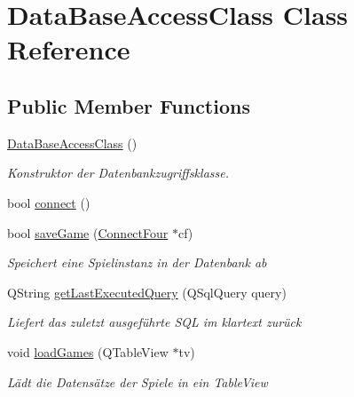 \hypertarget{class_data_base_access_class}{\section{Data\-Base\-Access\-Class Class Reference}
\label{class_data_base_access_class}
}
\subsection*{Public Member Functions}
\begin{DoxyCompactItemize}
\item 
\hyperlink{class_data_base_access_class_a44e5ea09d3bb57547bf4ed458549b00e}{Data\-Base\-Access\-Class} ()
\begin{DoxyCompactList}\small\item\em Konstruktor der Datenbankzugriffsklasse. \end{DoxyCompactList}\item 
bool \hyperlink{class_data_base_access_class_ad14618bc623fa2921405281100e98fd6}{connect} ()
\item 
bool \hyperlink{class_data_base_access_class_ac6944e91e73d748d54886921e10a8148}{save\-Game} (\hyperlink{class_connect_four}{Connect\-Four} $\ast$cf)
\begin{DoxyCompactList}\small\item\em Speichert eine Spielinstanz in der Datenbank ab \end{DoxyCompactList}\item 
Q\-String \hyperlink{class_data_base_access_class_a65a96f9e828f32087bf52c1624f78724}{get\-Last\-Executed\-Query} (Q\-Sql\-Query query)
\begin{DoxyCompactList}\small\item\em Liefert das zuletzt ausgeführte S\-Q\-L im klartext zurück \end{DoxyCompactList}\item 
void \hyperlink{class_data_base_access_class_a7b1d1dc517185da0160b0686963440cb}{load\-Games} (Q\-Table\-View $\ast$tv)
\begin{DoxyCompactList}\small\item\em Lädt die Datensätze der Spiele in ein Table\-View \end{DoxyCompactList}\end{DoxyCompactItemize}


